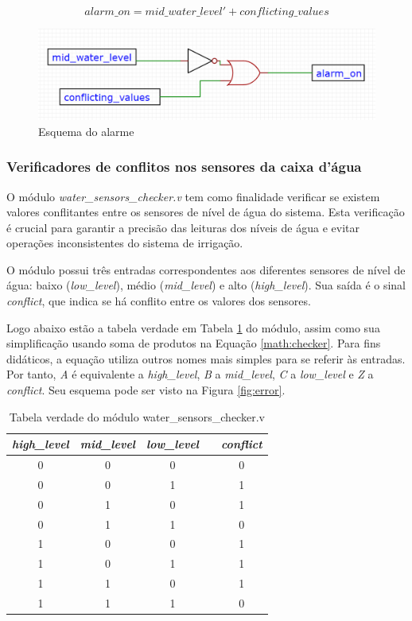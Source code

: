\documentclass[
	article,			%
	11pt,				%
	oneside,			%
	a4paper,			%
	english,			%
	brazil,				%
	sumario=tradicional
	]{abntex2}
\begin{document}
\begin{equation}
alarm\_on = mid\_water\_level' + conflicting\_values
\label{math:alarm}
\end{equation}

\begin{figure}[H]
    \centering
    \includegraphics[width=0.75\linewidth]{alarm.png}
    \caption{Esquema do alarme}
    \label{fig:alarm}
\end{figure}

\subsubsection{Verificadores de conflitos nos sensores da caixa d’água}

O módulo \textit{water\_sensors\_checker.v} tem como finalidade verificar se existem valores conflitantes entre os sensores de nível de água do sistema. 
Esta verificação é crucial para garantir a precisão das leituras dos níveis de água e evitar operações inconsistentes do sistema de irrigação.

O módulo possui três entradas correspondentes aos diferentes sensores de nível de água: baixo (\textit{low\_level}), médio (\textit{mid\_level}) e alto (\textit{high\_level}). 
Sua saída é o sinal \textit{conflict}, que indica se há conflito entre os valores dos sensores.

Logo abaixo estão a tabela verdade em Tabela \ref{tab:sensor-checker} do módulo, assim como sua simplificação usando soma de produtos na Equação \eqref{math:checker}. Para fins didáticos, a equação utiliza outros nomes mais simples para se referir às entradas. Por tanto, \textit{A} é equivalente a \textit{high\_level}, \textit{B} a \textit{mid\_level}, \textit{C} a \textit{low\_level} e \textit{Z} a \textit{conflict}. Seu esquema pode ser visto na Figura \ref{fig:error}.


\begin{table}[h]
\centering
\begin{tabular}{|c|c|c|l|c|}
\hline
\textit{high\_level} & \multicolumn{1}{l|}{\textit{mid\_level}} & \textit{low\_level} &  & \textit{conflict} \\ \hline
0 & 0 & 0 &  & 0 \\ \hline
0 & 0 & 1 &  & 1 \\ \hline
0 & 1 & 0 &  & 1 \\ \hline
0 & 1 & 1 &  & 0 \\ \hline
1 & 0 & 0 &  & 1 \\ \hline
1 & 0 & 1 &  & 1 \\ \hline
1 & 1 & 0 &  & 1 \\ \hline
1 & 1 & 1 &  & 0 \\ \hline
\end{tabular}
\caption{Tabela verdade do módulo water\_sensors\_checker.v}
\label{tab:sensor-checker}
\end{table}
\end{document}
